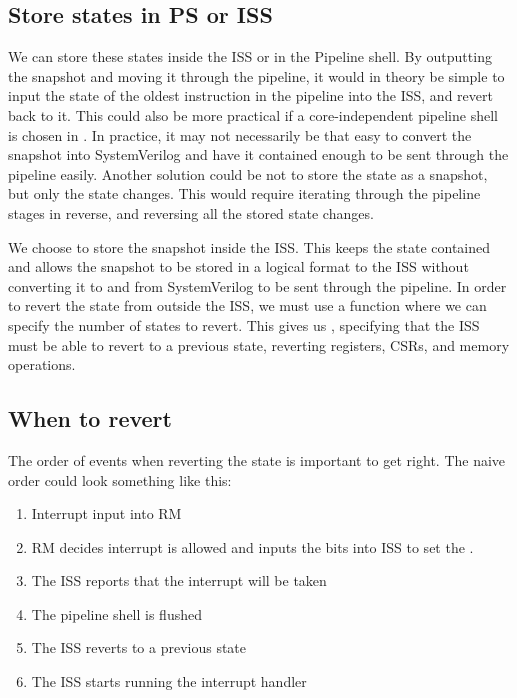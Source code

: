 \subsection{Store states in PS or ISS}

We can store these states inside the ISS or in the Pipeline shell. By outputting the snapshot and moving it through the pipeline, it would in theory be simple to input the state of the oldest instruction in the pipeline into the ISS, and revert back to it. This could also be more practical if a core-independent pipeline shell is chosen in . In practice, it may not necessarily be that easy to convert the snapshot into SystemVerilog and have it contained enough to be sent through the pipeline easily. Another solution could be not to store the state as a snapshot, but only the state changes. This would require iterating through the pipeline stages in reverse, and reversing all the stored state changes.

We choose to store the snapshot inside the ISS. This keeps the state contained and allows the snapshot to be stored in a logical format to the ISS without converting it to and from SystemVerilog to be sent through the pipeline. In order to revert the state from outside the ISS, we must use a function where we can specify the number of states to revert. This gives us \textbf{}, specifying that the ISS must be able to revert to a previous state, reverting registers, CSRs, and memory operations.

\subsection{When to revert}

The order of events when reverting the state is important to get right.
The naive order could look something like this:

\begin{enumerate}
    \item Interrupt input into RM
    \item RM decides interrupt is allowed and inputs the  bits into ISS to set the .
    \item The ISS reports that the interrupt will be taken
    \item The pipeline shell is flushed
    \item The ISS reverts to a previous state
    \item The ISS starts running the interrupt handler
\end{enumerate}

